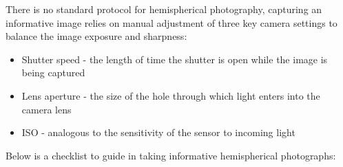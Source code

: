 \documentclass[11pt,a4paper]{article}
\begin{document}
There is no standard protocol for hemispherical photography, capturing an informative image relies on manual adjustment of three key camera settings to balance the image exposure and sharpness:

\begin{itemize}
	\item{Shutter speed - the length of time the shutter is open while the
		image is being captured}
	\item{Lens aperture - the size of the hole through which light enters into
		the camera lens}
	\item{ISO - analogous to the sensitivity of the sensor to incoming light}
\end{itemize}

Below is a checklist to guide in taking informative hemispherical photographs: 
\end{document}
